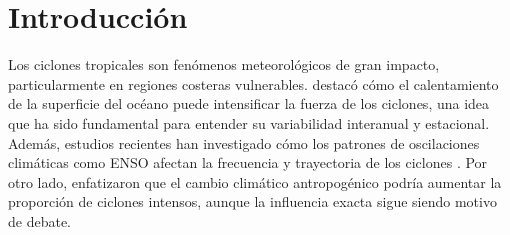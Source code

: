 \documentclass{article}
\begin{document}
\section{Introducción}

Los ciclones tropicales son fenómenos meteorológicos de gran impacto, particularmente en regiones costeras vulnerables. 
\textcite{Emanuel2005} destacó cómo el calentamiento de la superficie del océano puede intensificar la fuerza de los ciclones, 
una idea que ha sido fundamental para entender su variabilidad interanual y estacional. Además, estudios recientes han 
investigado cómo los patrones de oscilaciones climáticas como ENSO afectan la frecuencia y trayectoria de los ciclones 
\parencite{Camargo2007}. Por otro lado, \textcite{Knutson2010} enfatizaron que el cambio climático antropogénico podría 
aumentar la proporción de ciclones intensos, aunque la influencia exacta sigue siendo motivo de debate.


\printbibliography
\end{document}
